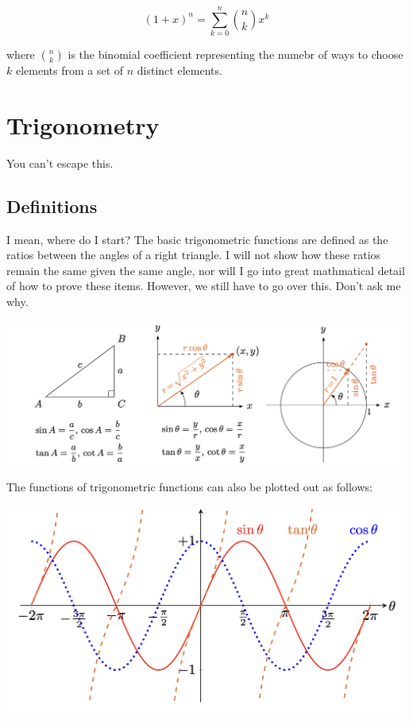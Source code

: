 \documentclass[12pt]{article}
\theoremstyle{plain}
\theoremstyle{definition}
\begin{document}
$$(1 + x)^n = \sum_{k=0}^{n} \binom{n}{k} x^k$$

where $\binom{n}{k}$ is the binomial coefficient representing the numebr of ways to choose $k$ elements from a set of $n$ distinct elements.

\break

\section{Trigonometry}

You can't escape this.

\subsection{Definitions}

I mean, where do I start? The basic trigonometric functions are defined as the ratios between the angles of a right triangle. I will not show how these ratios remain the same given the same angle, nor will I go into great mathmatical detail of how to prove these items. However, we still have to go over this. Don't ask me why. 

\includegraphics[width=\textwidth]{2_trig0}

The functions of trigonometric functions can also be plotted out as follows:

\includegraphics[width=\textwidth]{2_trig1}
\end{document}
